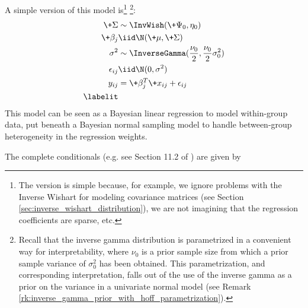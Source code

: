 \documentclass{article} %
\begin{document}
A simple version of this model is\footnote{The version is simple because,  for example,   we ignore problems with the Inverse Wishart for modeling covariance matrices (see Section \ref{sec:inverse_wishart_distribution}),  we are not imagining that the regression coefficients are sparse,  etc.} \footnote{Recall that the inverse gamma distribution is parametrized in a convenient way for interpretability,  where $\nu_0$ is a prior sample size from which a  prior sample variance of $\sigma_0^2$ has been obtained.  This parametrization,  and corresponding interpretation,  falls out of the use of the inverse gamma as a prior on the variance in a univariate normal model (see Remark \ref{rk:inverse_gamma_prior_with_hoff_parametrization}). }:
\begin{align*}
\+\Sigma &\sim \InvWish(\+\Psi_0,  \eta_0) \\
\+\beta_j &\iid \N(\+\mu,  \+\Sigma) \\
\sigma^2 &\sim \InverseGamma (\frac{\nu_0}{2}, \frac{\nu_0}{2} \sigma_0^2) \\
\epsilon_{ij} &\iid \N(0, \sigma^2) \\
y_{ij} &= \+\beta_j^T \+x_{ij} + \epsilon_{ij} \\
\labelit \label{eqn:hierarchical_linear_regression}
\end{align*}
This model can be seen as a Bayesian linear regression to model within-group data,  put beneath a Bayesian normal sampling model to handle between-group heterogeneity in the regression weights. 
 
The complete conditionals (e.g.  see Section 11.2 of \cite{hoff2009first}) are given by
\end{document}
